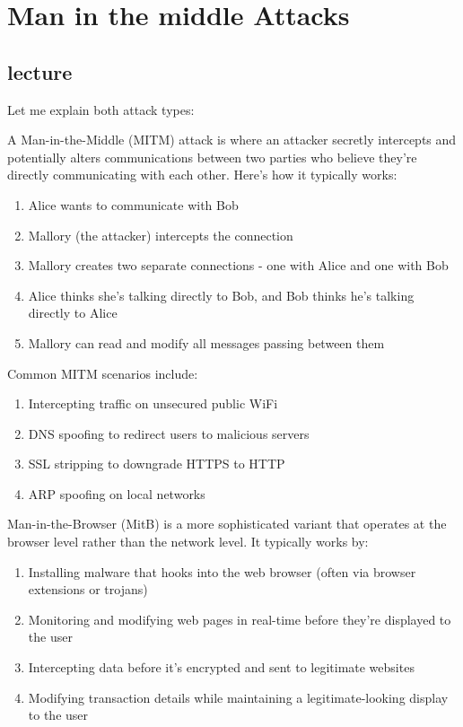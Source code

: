 
\chapter{Man in the middle Attacks}
\newpage

\section{lecture}
Let me explain both attack types:

A Man-in-the-Middle (MITM) attack is where an attacker secretly intercepts and potentially alters communications between two parties who believe they're directly communicating with each other. Here's how it typically works:

\begin{enumerate}
	\item Alice wants to communicate with Bob
	\item Mallory (the attacker) intercepts the connection
	\item Mallory creates two separate connections - one with Alice and one with Bob
	\item Alice thinks she's talking directly to Bob, and Bob thinks he's talking directly to Alice
	\item Mallory can read and modify all messages passing between them
\end{enumerate}

Common MITM scenarios include:
\begin{enumerate}
	\item Intercepting traffic on unsecured public WiFi
	\item DNS spoofing to redirect users to malicious servers
	\item SSL stripping to downgrade HTTPS to HTTP
	\item ARP spoofing on local networks
\end{enumerate}

Man-in-the-Browser (MitB) is a more sophisticated variant that operates at the browser level rather than the network level. It typically works by:

\begin{enumerate}
	\item Installing malware that hooks into the web browser (often via browser extensions or trojans)
	\item Monitoring and modifying web pages in real-time before they're displayed to the user
	\item Intercepting data before it's encrypted and sent to legitimate websites
	\item Modifying transaction details while maintaining a legitimate-looking display to the user
\end{enumerate}

